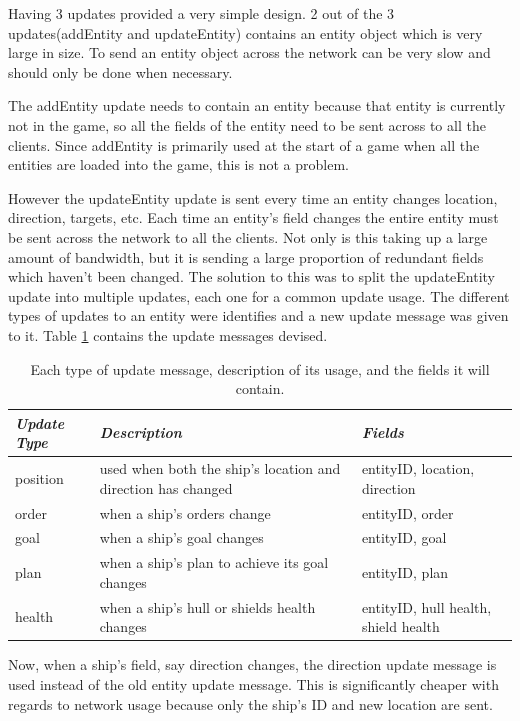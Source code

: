 Having 3 updates provided a very simple design. 
2 out of the 3 updates(addEntity and updateEntity) contains an entity object which is very large in size.
To send an entity object across the network can be very slow and should only be done when necessary.

The addEntity update needs to contain an entity because that entity is currently not in the game, so all the fields of the entity need to be sent across to all the clients. Since addEntity is primarily used at the start of a game when all the entities are loaded into the game, this is not a problem.

However the updateEntity update is sent every time an entity changes location, direction, targets, etc.
Each time an entity's field changes the entire entity must be sent across the network to all the clients.
Not only is this taking up a large amount of bandwidth, but it is sending a large proportion of redundant fields which haven't been changed.
The solution to this was to split the updateEntity update into multiple updates, each one for a common update usage.
The different types of updates to an entity were identifies and a new update message was given to it. 
Table \ref{tab:updateMessageTypes} contains the update messages devised.

\begin{table}
    \begin{tabular}{p{5em} p{15em} p{6em}}
    \toprule
    \emph{Update Type} & \emph{Description} & \emph{Fields} \\
    \midrule
    position & used when both the ship's location and direction has changed & entityID, location, direction \\
    order & when a ship's orders change & entityID, order \\
    goal & when a ship's goal changes & entityID, goal \\
    plan & when a ship's plan to achieve its goal changes & entityID, plan \\
    health & when a ship's hull or shields health changes & entityID, hull health, shield health \\ 
    \bottomrule
    \end{tabular}
    	\vspace{1em}
	\caption[Message update times]{Each type of update message, description of its usage, and the fields it will contain.}
	\label{tab:updateMessageTypes}
\end{table}

Now, when a ship's field, say direction changes, the direction update message is used instead of the old entity update message.
This is significantly cheaper with regards to network usage because only the ship's ID and new location are sent.

